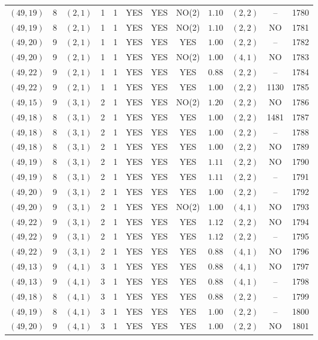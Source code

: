 \begin{longtable}{|c|c|c|c|c|c|c|c|c|c|c|c|}
$(49,19)$ & 8 & $(2,1)$ & 1 & 1 & YES & YES & NO(2) & $1.10$ & $(2,2)$ & -- & 1780\\
$(49,19)$ & 8 & $(2,1)$ & 1 & 1 & YES & YES & NO(2) & $1.10$ & $(2,2)$ & NO & 1781\\
$(49,20)$ & 9 & $(2,1)$ & 1 & 1 & YES & YES & YES & $1.00$ & $(2,2)$ & -- & 1782\\
$(49,20)$ & 9 & $(2,1)$ & 1 & 1 & YES & YES & NO(2) & $1.00$ & $(4,1)$ & NO & 1783\\
$(49,22)$ & 9 & $(2,1)$ & 1 & 1 & YES & YES & YES & $0.88$ & $(2,2)$ & -- & 1784\\
$(49,22)$ & 9 & $(2,1)$ & 1 & 1 & YES & YES & YES & $1.00$ & $(2,2)$ & 1130 & 1785\\
$(49,15)$ & 9 & $(3,1)$ & 2 & 1 & YES & YES & NO(2) & $1.20$ & $(2,2)$ & NO & 1786\\
$(49,18)$ & 8 & $(3,1)$ & 2 & 1 & YES & YES & YES & $1.00$ & $(2,2)$ & 1481 & 1787\\
$(49,18)$ & 8 & $(3,1)$ & 2 & 1 & YES & YES & YES & $1.00$ & $(2,2)$ & -- & 1788\\
$(49,18)$ & 8 & $(3,1)$ & 2 & 1 & YES & YES & YES & $1.00$ & $(2,2)$ & NO & 1789\\
$(49,19)$ & 8 & $(3,1)$ & 2 & 1 & YES & YES & YES & $1.11$ & $(2,2)$ & NO & 1790\\
$(49,19)$ & 8 & $(3,1)$ & 2 & 1 & YES & YES & YES & $1.11$ & $(2,2)$ & -- & 1791\\
$(49,20)$ & 9 & $(3,1)$ & 2 & 1 & YES & YES & YES & $1.00$ & $(2,2)$ & -- & 1792\\
$(49,20)$ & 9 & $(3,1)$ & 2 & 1 & YES & YES & NO(2) & $1.00$ & $(4,1)$ & NO & 1793\\
$(49,22)$ & 9 & $(3,1)$ & 2 & 1 & YES & YES & YES & $1.12$ & $(2,2)$ & NO & 1794\\
$(49,22)$ & 9 & $(3,1)$ & 2 & 1 & YES & YES & YES & $1.12$ & $(2,2)$ & -- & 1795\\
$(49,22)$ & 9 & $(3,1)$ & 2 & 1 & YES & YES & YES & $0.88$ & $(4,1)$ & NO & 1796\\
$(49,13)$ & 9 & $(4,1)$ & 3 & 1 & YES & YES & YES & $0.88$ & $(4,1)$ & NO & 1797\\
$(49,13)$ & 9 & $(4,1)$ & 3 & 1 & YES & YES & YES & $0.88$ & $(4,1)$ & -- & 1798\\
$(49,18)$ & 8 & $(4,1)$ & 3 & 1 & YES & YES & YES & $0.88$ & $(2,2)$ & -- & 1799\\
$(49,19)$ & 8 & $(4,1)$ & 3 & 1 & YES & YES & YES & $1.00$ & $(2,2)$ & -- & 1800\\
$(49,20)$ & 9 & $(4,1)$ & 3 & 1 & YES & YES & YES & $1.00$ & $(2,2)$ & NO & 1801\\

\end{longtable}
